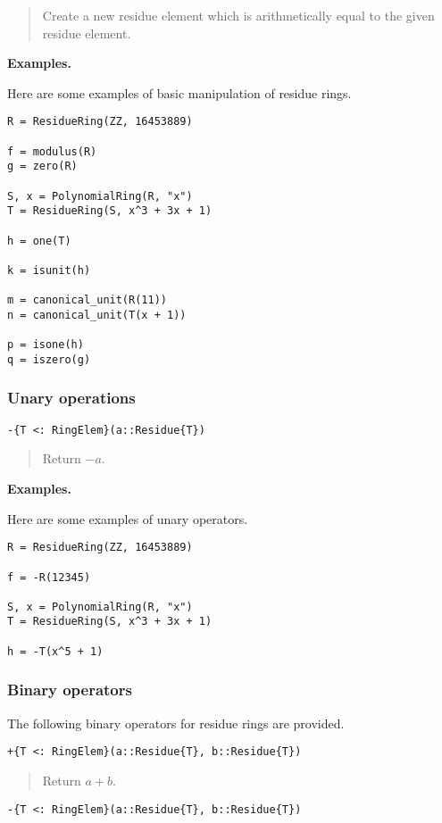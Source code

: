 \documentclass[a4paper,10pt]{article}
\newcommand{\desc}[1]{\vspace{-3mm}\begin{quote}#1\end{quote}}
\begin{document}
\desc{Create a new residue element which is arithmetically equal to the given
residue element.}

\textbf{Examples.}

Here are some examples of basic manipulation of residue rings.

\begin{lstlisting}
R = ResidueRing(ZZ, 16453889)

f = modulus(R)
g = zero(R)

S, x = PolynomialRing(R, "x")
T = ResidueRing(S, x^3 + 3x + 1)

h = one(T)

k = isunit(h)

m = canonical_unit(R(11))
n = canonical_unit(T(x + 1))

p = isone(h)
q = iszero(g)
\end{lstlisting}

\subsubsection{Unary operations}

\begin{lstlisting}
-{T <: RingElem}(a::Residue{T})
\end{lstlisting}

\desc{Return $-a$.}

\textbf{Examples.}

Here are some examples of unary operators.

\begin{lstlisting}
R = ResidueRing(ZZ, 16453889)

f = -R(12345)

S, x = PolynomialRing(R, "x")
T = ResidueRing(S, x^3 + 3x + 1)

h = -T(x^5 + 1)
\end{lstlisting}

\subsubsection{Binary operators}

The following binary operators for residue rings are provided.

\begin{lstlisting}
+{T <: RingElem}(a::Residue{T}, b::Residue{T})
\end{lstlisting}

\desc{Return $a + b$.}

\begin{lstlisting}
-{T <: RingElem}(a::Residue{T}, b::Residue{T})
\end{lstlisting}
\end{document}
